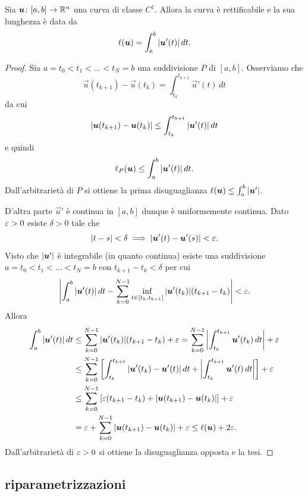 \begin{theorem}
    Sia $\boldsymbol u \colon [a,b] \to {\mathbb R}^n$ una curva di classe $C^1$.
    Allora la curva è rettificabile e la sua lunghezza è data da
    \[
      \ell(\boldsymbol u) = \int_a^b {\left|\boldsymbol u'(t)\right|} \, dt.
    \]
\end{theorem}
\begin{proof}
Sia $a = t_0 < t_1 < \dots < t_N = b$ una suddivisione $P$ di $[a,b]$.
Osserviamo che 
\[
  \vec u(t_{k+1}) - \vec u(t_k) = \int_{t_k}^{t_{k+1}} \vec u'(t) \, dt
\]
da cui 
\[
 {\left|\boldsymbol u(t_{k+1})-\boldsymbol u(t_k)\right|} \le \int_{t_k}^{t_{k+1}} {\left|\boldsymbol u'(t)\right|} \, dt
\]
e quindi 
\[
  \ell_P(\boldsymbol u) \le \int_a^b {\left|\boldsymbol u'(t)\right|} \, dt.
\]
Dall'arbitrarietà di $P$ si ottiene la prima disuguaglianza 
$\ell(\boldsymbol u) \le \int_a^b {\left|\boldsymbol u'\right|}$.

D'altra parte $\vec u'$ è continua in $[a,b]$ dunque è uniformemente continua.
Dato $\varepsilon>0$ esiste $\delta>0$ tale che
\[
  {\left|t-s\right|} < \delta \implies {\left|\boldsymbol u'(t) - \boldsymbol u'(s)\right|} < \varepsilon.
\]
Visto che ${\left|\boldsymbol u'\right|}$ è integrabile (in quanto continua) esiste una suddivisione
$a = t_0 < t_1 < \dots < t_N = b$ con $t_{k+1}-t_k < \delta$ per cui
\[
  {\left|\int_a^b {\left|\boldsymbol u'(t)\right|} \, dt - \sum_{k=0}^{N-1} \inf_{t\in [t_k, t_{k+1}]} {\left|\boldsymbol u'(t_k)\right|} (t_{k+1}-t_k)\right|} 
  < \varepsilon.
\]
Allora 
\begin{align*}
  \int_a^b {\left|\boldsymbol u'(t)\right|} \, dt
    &\le \sum_{k=0}^{N-1} {\left|\boldsymbol u'(t_k)\right|} (t_{k+1}-t_k) + \varepsilon
    = \sum_{k=0}^{N-1} {\left| \int_{t_k}^{t_{k+1}} \boldsymbol u'(t_k) \, dt\right|} + \varepsilon \\
    &\le \sum_{k=0}^{N-1} {\left[ \int_{t_k}^{t_{k+1}} {\left|\boldsymbol u'(t_k) - \boldsymbol u'(t)\right|} \, dt + {\left|\int_{t_k}^{t_{k+1}} \boldsymbol u'(t)\, dt\right|} \right]} + \varepsilon \\
    &\le \sum_{k=0}^{N-1} {\left[  \varepsilon (t_{k+1}-t_k) + {\left|\boldsymbol u(t_{k+1}) - \boldsymbol u(t_k)\right|} \right]} + \varepsilon \\
    &=  \varepsilon + \sum_{k=0}^{N-1}  {\left|\boldsymbol u(t_{k+1}) - \boldsymbol u(t_k)\right|} + \varepsilon
    \le \ell(\boldsymbol u) + 2\varepsilon.
\end{align*}
Dall'arbitrarietà di $\varepsilon>0$ si ottiene la disuguaglianza opposta e la tesi.
\end{proof}

\subsection{riparametrizzazioni}

